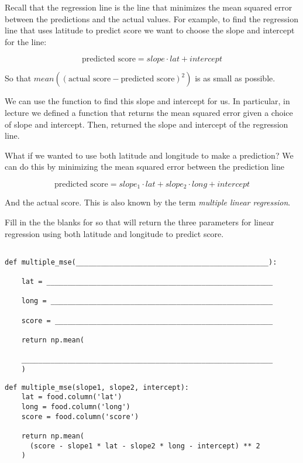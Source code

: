 \begin{parts}
Recall that the regression line is the line that minimizes the mean squared
error between the predictions and the actual values. For example, to find the
regression line that uses latitude to predict score we want to choose the slope
and intercept for the line:

\[ \text{predicted score} = slope \cdot lat + intercept \]

So that $ mean((\text{actual score} - \text{predicted score})^2) $ is as small
as possible.

We can use the  function to find this slope and intercept for
us. In particular, in lecture we defined a function
 that returns the mean squared error given a
choice of slope and intercept. Then,  returned the slope
and intercept of the regression line.

What if we wanted to use both latitude and longitude to make a prediction? We
can do this by minimizing the mean squared error between the prediction line

\[ \text{predicted score} = slope_1 \cdot lat +
   slope_2 \cdot long + intercept \]

And the actual score. This is
also known by the term \emph{multiple linear regression}.

Fill in the the blanks for  so that
 will return the three parameters for linear
regression using both latitude and longitude to predict score.

\begin{verbatim}

def multiple_mse(______________________________________________):

    lat = ______________________________________________________

    long = _____________________________________________________

    score = ____________________________________________________

    return np.mean(

    ____________________________________________________________
    )

\end{verbatim}

\begin{solution}
\begin{verbatim}
def multiple_mse(slope1, slope2, intercept):
    lat = food.column('lat')
    long = food.column('long')
    score = food.column('score')

    return np.mean(
      (score - slope1 * lat - slope2 * long - intercept) ** 2
    )
\end{verbatim}
\end{solution}

\end{parts}
